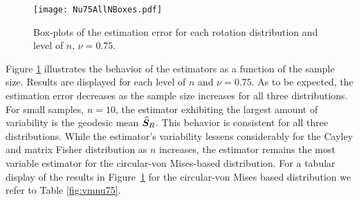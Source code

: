 \begin{figure}[h!]
\centering
\texttt{[image: Nu75AllNBoxes.pdf]}
\caption{Box-plots of the estimation error for each rotation distribution and level of $n$,  $\nu=0.75$.}
\label{fig:NBoxes}
\end{figure}

\noindent Figure \ref{fig:NBoxes} illustrates the behavior of the estimators as a function of the sample size. Results are displayed for each level of $n$ and  $\nu=0.75$. As to be expected, the estimation error decreases as the sample size increases for all three distributions. For small samples, $n=10$, the estimator exhibiting the largest amount of variability is the geodesic mean ${\widehat{\bm S}_R}$. This behavior is consistent for all three distributions.  While the estimator's variability lessens considerably for the Cayley and matrix Fisher distribution as $n$ increases, the estimator remains the most variable estimator for the circular-von Mises-based distribution.   For a tabular display of the results in Figure~\ref{fig:NBoxes} for the circular-von Mises based distribution we refer to Table \ref{fig:vmnu75}.  


